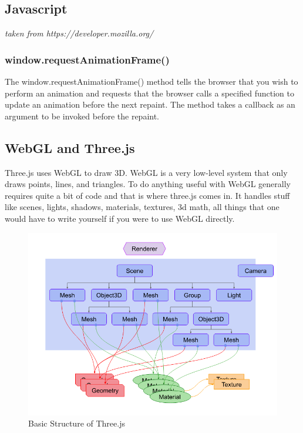 \documentclass{article}
\begin{document}
    \subsection{Javascript}
    \textit{taken from https://developer.mozilla.org/}
    \subsubsection{window.requestAnimationFrame()}The window.requestAnimationFrame() method tells the browser that you wish to perform an animation and requests that the browser calls a specified function to update an animation before the next repaint. The method takes a callback as an argument to be invoked before the repaint.
	\subsection{WebGL and Three.js}


	Three.js uses WebGL to draw 3D. WebGL is a very low-level system that only draws points, lines, and triangles. To do anything useful with WebGL generally requires quite a bit of code and that is where three.js comes in. It handles stuff like scenes, lights, shadows, materials, textures, 3d math, all things that one would have to write yourself if you were to use WebGL directly. %

	   \begin{figure}[H]
            \centering
            \includegraphics[width=15cm]{images/threeDotJS/threeJsStructure.png}
            \caption{Basic Structure of Three.js}
        \end{figure}
\end{document}
